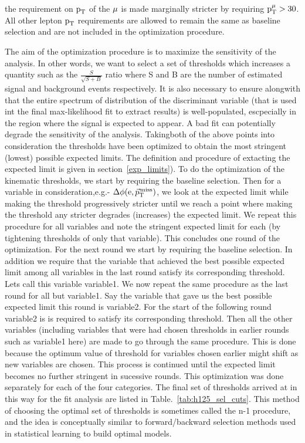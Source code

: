 the requirement on $\text{p}_\text{T}$ of the $\mu$ is made marginally stricter by requiring  $\text{p}_\text{T}^{\mu} > 30$\GeV. All other lepton $\text{p}_\text{T}$ requirements are allowed to remain the same as baseline selection and are not included in the optimization procedure.   

The aim of the optimization procedure is to maximize the sensitivity of the analysis. In other words, we want to select a set of thresholds which increases a quantity such as the $\frac{S}{\sqrt{S+B}}$ ratio where S and B are the number of estimated signal and background events respectively. It is also necessary to ensure alongwith that the entire spectrum of distribution of the discriminant variable (that is used int the final max-likelihood fit to extract results) is well-populated, escpecially in the region where the signal is expected to appear. A bad fit can potentially degrade the sensitivity of the analysis. Takingboth of the above points into consideration the thresholds have been optimized to obtain the most stringent (lowest) possible expected limits. The definition and procedure of extacting the expected limit is given in section~\ref{exp_limits}). To do the optimization of the kinematic thresholds, we start by requiring the baseline selection. Then for a variable in consideration,e.g.- $\Delta\phi(\text{e}, {\vec p}_{\mathrm{T}}^{\kern1pt\text{miss}})$, we look at the expected limit while making the threshold progressively stricter until we reach a point where making the threshold any stricter degrades (increases) the expected limit. We repeat this procedure for all variables and note the stringent expected limit for each (by tightening thresholds of only that variable). This concludes one round of the optimization. For the next round we start by requiring the baseline selection. In addition we require that the variable that achieved the best possible expected limit among all variables in the last round satisfy its corresponding threshold. Lets call this variable variable1. We now repeat the same procedure as the last round for all but variable1. Say the variable that gave us the best possible expected limit this round is variable2. For the start of the following round variable2 is is required to satisfy its corresponding threshold. Then all the other variables (including variables that were had chosen thresholds in earlier rounds such as variable1 here) are made to go through the same procedure. This is done because the optimum value of threshold for variables chosen earlier might shift as new variables are chosen. This process is continued until the expected limit becomes no further stringent in sucessive rounds. This optimization was done separately for each of the four categories. The final set of thresholds arrived at in this way for the \hmue \mcol fit analysis are listed in Table.~\ref{tab:h125_sel_cuts}. This method of choosing the optimal set of thresholds is sometimes called the n-1 procedure, and the idea is conceptually similar to forward/backward selection methods used in statistical learning to build optimal models.             


